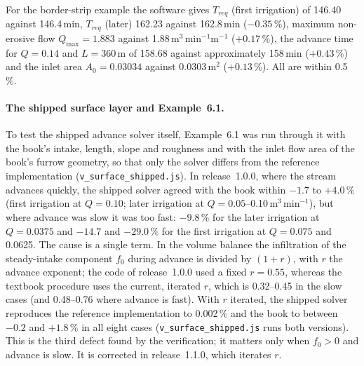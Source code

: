 \documentclass[preprint,12pt]{elsarticle}
\begin{document}
For the border-strip example the software gives $T_{req}$ (first irrigation) of 146.40 against 146.4\,min, $T_{req}$ (later) 162.23 against 162.8\,min ($-0.35$\,\%), maximum non-erosive flow $Q_{\max}=1.883$ against 1.88\,m$^3$\,min$^{-1}$m$^{-1}$ ($+0.17$\,\%), the advance time for $Q=0.14$ and $L=360$\,m of 158.68 against approximately 158\,min ($+0.43$\,\%) and the inlet area $A_0=0.03034$ against 0.0303\,m$^2$ ($+0.13$\,\%). All are within 0.5\,\%.

\paragraph{The shipped surface layer and Example~6.1.} To test the shipped advance solver itself, Example~6.1 was run through it with the book's intake, length, slope and roughness and with the inlet flow area of the book's furrow geometry, so that only the solver differs from the reference implementation (\texttt{v\_surface\_shipped.js}). In release~1.0.0, where the stream advances quickly, the shipped solver agreed with the book within $-1.7$ to $+4.0$\,\% (first irrigation at $Q=0.10$; later irrigation at $Q=0.05$--0.10\,m$^3$\,min$^{-1}$), but where advance was slow it was too fast: $-9.8$\,\% for the later irrigation at $Q=0.0375$ and $-14.7$ and $-29.0$\,\% for the first irrigation at $Q=0.075$ and 0.0625. The cause is a single term. In the volume balance the infiltration of the steady-intake component $f_0$ during advance is divided by $(1+r)$, with $r$ the advance exponent; the code of release~1.0.0 used a fixed $r=0.55$, whereas the textbook procedure uses the current, iterated $r$, which is 0.32--0.45 in the slow cases (and 0.48--0.76 where advance is fast). With $r$ iterated, the shipped solver reproduces the reference implementation to 0.002\,\% and the book to between $-0.2$ and $+1.8$\,\% in all eight cases (\texttt{v\_surface\_shipped.js} runs both versions). This is the third defect found by the verification; it matters only when $f_0>0$ and advance is slow. It is corrected in release~1.1.0, which iterates $r$.
\end{document}
